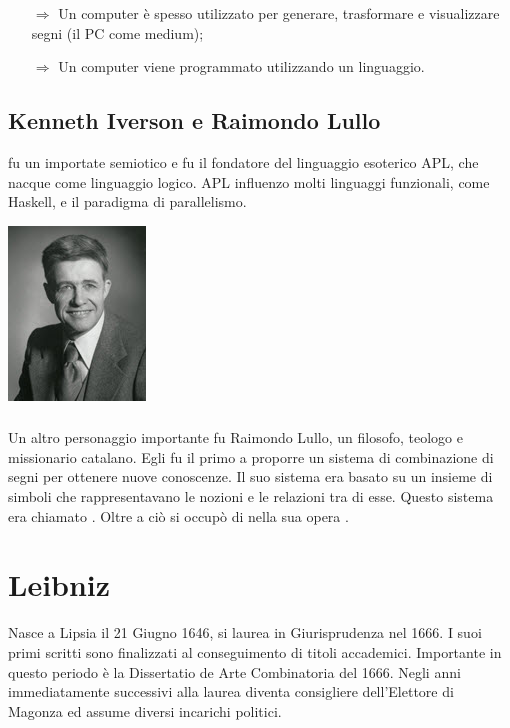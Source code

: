 \begin{itemize}
    \item [$\Rightarrow$] Un computer è spesso utilizzato per generare, trasformare e visualizzare segni (il PC come medium);
    \item [$\Rightarrow$] Un computer viene programmato utilizzando un linguaggio.
\end{itemize}

\subsection{Kenneth Iverson e Raimondo Lullo}

 fu un importate semiotico e fu il fondatore del linguaggio esoterico APL, che nacque come linguaggio logico. APL influenzo molti linguaggi funzionali, come Haskell, e il paradigma di parallelismo.

\begin{center}
    \includegraphics[scale = 1]{images/iverson.jpg}
\end{center}

\subsubsection{}

Un altro personaggio importante fu Raimondo Lullo, un filosofo, teologo e missionario catalano. Egli fu il primo a proporre un sistema di combinazione di segni per ottenere nuove conoscenze. Il suo sistema era basato su un insieme di simboli che rappresentavano le nozioni e le relazioni tra di esse. Questo sistema era chiamato .
Oltre a ciò si occupò di  nella sua opera .

\section{Leibniz}

Nasce a Lipsia il 21 Giugno 1646, si laurea in Giurisprudenza nel 1666.
I suoi primi scritti sono finalizzati al conseguimento di titoli accademici. Importante in
questo periodo è la Dissertatio de Arte Combinatoria del 1666.
Negli anni immediatamente successivi alla laurea diventa consigliere dell’Elettore di
Magonza ed assume diversi incarichi politici.

